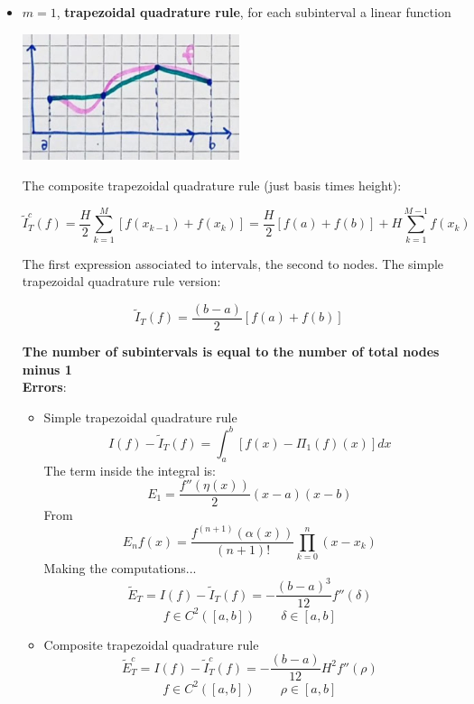 \begin{itemize}
    \item $m=1$, \textbf{trapezoidal quadrature rule}, for each subinterval a linear function
    \begin{center}
        \includegraphics[width=0.5\textwidth]{images/quadrature_m1.png}
    \end{center}
    The composite trapezoidal quadrature rule (just basis times height):
    \begin{LARGE}
        $$
        \tilde{I}_{T}^c(f)=
        \frac{H}{2}
        \sum_{k=1}^M
        \left[
            f(x_{k-1})+f(x_k)
        \right]=
        \frac{H}{2}
        \left[
            f(a)+f(b)
        \right]+
        H\sum_{k=1}^{M-1}f(x_k)
        $$
    \end{LARGE}
    The first expression associated to intervals, the second to nodes. The simple trapezoidal quadrature rule version:
    \begin{LARGE}
        $$
        \tilde{I}_T(f)=\frac{(b-a)}{2}\left[f(a)+f(b)\right]
        $$
    \end{LARGE}
    \textbf{The number of subintervals is equal to the number of total nodes minus 1}\\
    \textbf{Errors}:
    \begin{itemize}
        \item Simple trapezoidal quadrature rule
        $$
        I(f)-\tilde{I}_T(f)=\int_a^b\left[f(x)-\Pi_1(f)(x)\right]dx
        $$
        The term inside the integral is:
        $$
        E_1=\frac{f''(\eta(x))}{2}(x-a)(x-b)
        $$
        From
        $$
        E_nf(x)=\frac{f^{(n+1)}(\alpha(x))}{(n+1)!}\prod_{k=0}^n(x-x_k)
        $$
        Making the computations...
        $$
        \tilde{E}_T=I(f)-\tilde{I}_T(f)=
        -\frac{(b-a)^3}{12}f''(\delta)
        $$
        $$
        f\in C^2([a,b])\qquad\delta\in[a,b]
        $$
        \item Composite trapezoidal quadrature rule
        $$
        \tilde{E}_T^c=I(f)-\tilde{I}_T^c(f)=
        -\frac{(b-a)}{12}H^2f''(\rho)
        $$
        $$
        f\in C^2([a,b])\qquad\rho\in[a,b]
        $$
    \end{itemize}

\end{itemize}

